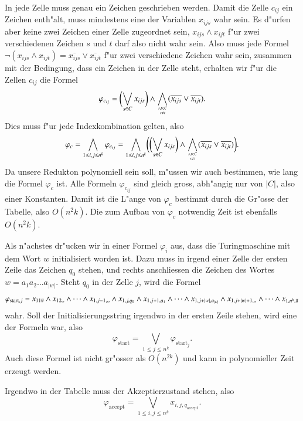 In jede Zelle muss genau ein Zeichen geschrieben werden. Damit die Zelle
$c_{ij}$ ein Zeichen enth"alt, muss mindestens eine der Variablen $x_{ijs}$
wahr sein. Es d"urfen aber keine zwei Zeichen einer Zelle zugeordnet sein,
$x_{ijs}\wedge x_{ijt}$ f"ur zwei verschiedenen Zeichen $s$ und $t$ darf
also nicht wahr sein. Also muss jede Formel
$\neg(x_{ijs}\wedge x_{ijt})=\overline{x_{ijs}}\vee\overline{x_{ijt}}$
f"ur zwei verschiedene Zeichen wahr sein, zusammen mit der
Bedingung, dass ein Zeichen in der Zelle steht, erhalten wir
f"ur die Zellen $c_{ij}$ die Formel
\[
\varphi_{c_{ij}}=
\biggl(\bigvee_{s\in C} x_{ijs}\biggr)\wedge
\bigwedge_{s,t\in C\atop s\ne t} (\overline{x_{ijs}}\vee\overline{x_{ijt}}).
\]
Dies muss f"ur jede Indexkombination gelten, also
\[
\varphi_c
=
\bigwedge_{1\le i,j\le n^k}
\varphi_{c_{ij}}
=
\bigwedge_{1\le i,j\le n^k}\biggl(
\biggl(\bigvee_{s\in C} x_{ijs}\biggr)\wedge
\bigwedge_{s,t\in C\atop s\ne t} (\overline{x_{ijs}}\vee\overline{x_{ijt}})
\biggr).
\]
Da unsere Redukton polynomiell sein soll, m"ussen wir auch bestimmen,
wie lang die Formel $\varphi_c$ ist. Alle Formeln $\varphi_{c_{ij}}$
sind gleich gross, abh"angig nur von $|C|$, also einer Konstanten.
Damit ist die L"ange von $\varphi_c$ bestimmt durch die Gr"osse der
Tabelle, also $O(n^2k)$. Die zum Aufbau von $\varphi_c$ notwendig Zeit
ist ebenfalls $O(n^2k)$.

Als n"achstes dr"ucken wir in einer Formel $\varphi_i$ aus,
dass die Turingmaschine mit dem
Wort $w$ initialisiert worden ist. Dazu muss in irgend einer
Zelle der ersten Zeile das Zeichen $q_0$ stehen, und rechts
anschliessen die Zeichen des Wortes $w=a_1a_2\dots a_{|w|}$.
Steht $q_0$ in der
Zelle $j$, wird die Formel
\[
\varphi_{\text{start},j}
=
x_{11\#}\wedge
x_{12\blank}\wedge \dots \wedge
x_{1,j-1,\blank}\wedge
x_{1,j,q_0}\wedge
x_{1,j+1,a_1}\wedge\dots\wedge
x_{1,j+|w|,a_{|w|}}\wedge
x_{1,j+|w|+1,\blank}\wedge\dots\wedge
x_{1,n^k,\#}
\]
wahr.
Soll der Initialisierungsstring irgendwo in der ersten Zeile
stehen, wird eine der Formeln war, also
\[
\varphi_{\text{start}} = \bigvee_{1\le j\le n^k} \varphi_{\text{start}_j}.
\]
Auch diese Formel ist nicht gr"osser als $O(n^{2k})$ und kann in
polynomieller Zeit erzeugt werden.

Irgendwo in der Tabelle muss der Akzeptierzustand stehen, also
\[
\varphi_{\text{accept}} 
=
\bigvee_{1\le i,j\le n^k} x_{i,j,q_{\text{accept}}}.
\]

